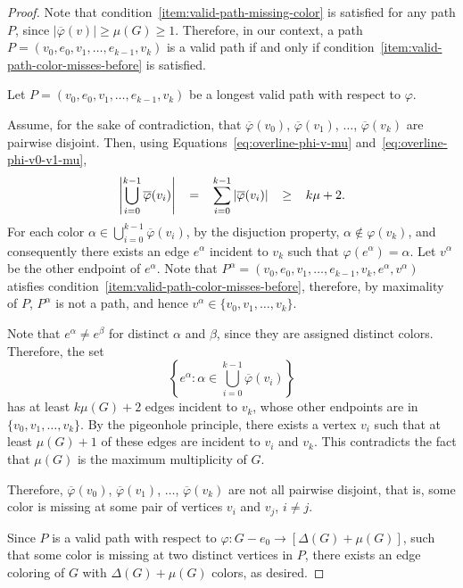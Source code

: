 \begin{proof}
    Note that condition~\ref{item:valid-path-missing-color} is satisfied for any path \(P\),
    since \(|\overline\varphi(v)| \geq \mu(G) \geq 1\).
    Therefore, in our context,
    a path \(P = (v_0, e_0, v_1, \dots, e_{k-1}, v_k)\) is a valid path
    if and only if
    condition~\ref{item:valid-path-color-misses-before} is satisfied.

    Let \(P = (v_0, e_0, v_1, \dots, e_{k-1}, v_k)\) be
    a longest valid path with respect to \(\varphi\).

    Assume,
    for the sake of contradiction, that
    \(\overline\varphi(v_0)\),
    \(\overline\varphi(v_1)\),
    \(\dots\),
    \(\overline\varphi(v_k)\)
    are pairwise disjoint.
    Then, using Equations~\eqref{eq:overline-phi-v-mu} and~\eqref{eq:overline-phi-v0-v1-mu},
    \begin{equation}
        \thickmuskip=20mu
        \left| \bigcup_{i=0}^{k-1} \overline\varphi(v_i) \right|
        = \sum_{i=0}^{k-1} |\overline\varphi(v_i)|
        \geq k\mu + 2.
    \end{equation}
    For each color \(\alpha \in \bigcup_{i=0}^{k-1} \overline\varphi(v_i)\),
    by the disjuction property, \(\alpha \notin \varphi(v_k)\),
    and consequently
    there exists an edge \(e^{\alpha}\) incident to \(v_k\)
    such that \(\varphi(e^{\alpha}) = \alpha\).
    Let \(v^{\alpha}\) be the other endpoint of \(e^{\alpha}\).
    Note that \(P^{\alpha} = (v_0, e_0, v_1, \dots, e_{k-1}, v_k, e^{\alpha}, v^{\alpha})\)
    atisfies condition~\ref{item:valid-path-color-misses-before},
    therefore, by maximality of \(P\),
    \(P^{\alpha}\) is not a path,
    and hence \(v^{\alpha} \in \{v_0, v_1, \dots, v_k\}\).

    Note that \(e^{\alpha} \neq e^{\beta}\) for distinct \(\alpha\) and \(\beta\), since they are assigned distinct colors.
    Therefore, the set
    \begin{equation}
        \left\{ e^{\alpha} : \alpha \in \bigcup_{i=0}^{k-1} \overline\varphi(v_i) \right\}
    \end{equation}
    has at least \(k\mu(G) + 2\) edges incident to \(v_k\),
    whose other endpoints are in \(\{v_0, v_1, \dots, v_k\}\).
    By the pigeonhole principle,
    there exists a vertex \(v_i\) such that
    at least \(\mu(G) + 1\) of these edges are incident to \(v_i\) and \(v_k\).
    This contradicts the fact that \(\mu(G)\) is the maximum multiplicity of \(G\).

    Therefore,
    \(\overline\varphi(v_0)\),
    \(\overline\varphi(v_1)\),
    \(\dots\),
    \(\overline\varphi(v_k)\)
    are not all pairwise disjoint, that is,
    some color is missing at some pair of vertices \(v_i\) and \(v_j\), \(i \neq j\).

    Since \(P\) is a valid path with respect to \(\varphi \colon G-e_0 \to [\Delta(G) + \mu(G)]\),
    such that some color is missing at two distinct vertices in \(P\),
    there exists an edge coloring of \(G\) with \(\Delta(G) + \mu(G)\) colors,
    as desired.
\end{proof}

